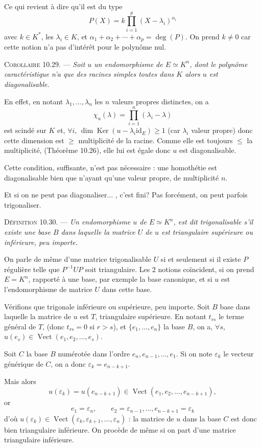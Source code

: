 Ce qui revient à dire qu'il est du type
\[
P(X)=k\prod_{i=1}^p(X-\lambda_i)^{\alpha_i}
\]
avec $k\in K^*$, les $\lambda_i\in K$, et $\alpha_1+\alpha_2+\cdots+\alpha_p=\deg(P)$. On prend $k\ne0$ car cette notion n'a pas d'intérêt pour le polynôme nul.

\medskip\noindent\textsc{Corollaire 10.29.} --- \emph{Soit $u$ un endomorphisme de $E\simeq K^n$, dont le polynôme caractéristique n'a que des racines simples toutes dans $K$ alors $u$ est diagonalisable.}

En effet, en notant $\lambda_1,\ldots,\lambda_n$ les $n$ valeurs propres distinctes, on a
\[
\chi_u(\lambda)=\prod_{i=1}^n(\lambda_i-\lambda)
\]
est scindé sur $K$ et, $\forall i$, $\dim\operatorname{Ker}(u-\lambda_i\mathrm{id}_E)\ge1$ (car $\lambda_i$ valeur propre) donc cette dimension est $\ge$ multiplicité de la racine. Comme elle est toujours $\le$ la multiplicité, (Théorème 10.26), elle lui est égale donc $u$ est diagonalisable. \bookend

Cette condition, suffisante, n'est pas nécessaire : une homothétie est diagonalisable bien que n'ayant qu'une valeur propre, de multiplicité $n$.

Et si on ne peut pas diagonaliser... , c'est fini? Pas forcément, on peut parfois trigonaliser.

\medskip\noindent\textsc{Définition 10.30.} --- \emph{Un endomorphisme $u$ de $E\simeq K^n$, est dit trigonalisable s'il existe une base $B$ dans laquelle la matrice $U$ de $u$ est triangulaire supérieure ou inférieure, peu importe.}

On parle de même d'une matrice trigonalisable $U$ si et seulement si il existe $P$ régulière telle que $P^{-1}UP$ soit triangulaire. Les 2 notions coïncident, si on prend $E=K^n$, rapporté à une base, par exemple la base canonique, et si $u$ est l'endomorphisme de matrice $U$ dans cette base.

Vérifions que trigonale inférieure ou supérieure, peu importe. Soit $B$ base dans laquelle la matrice de $u$ est $T$, triangulaire supérieure. En notant $t_{rs}$ le terme général de $T$, (donc $t_{rs}=0$ si $r>s$), et $\{e_1,\ldots,e_n\}$ la base $B$, on a, $\forall s$, $u(e_s)\in\operatorname{Vect}(e_1,e_2,\ldots,e_s)$.

Soit $C$ la base $B$ numérotée dans l'ordre $e_n,e_{n-1},\ldots,e_1$. Si on note $\varepsilon_k$ le vecteur générique de $C$, on a donc $\varepsilon_k=e_{n-k+1}$.

Mais alors
\[
u(\varepsilon_k)=u(e_{n-k+1})\in\operatorname{Vect}(e_1,e_2,\ldots,e_{n-k+1}),
\]
or
\[
e_1=\varepsilon_n,
\qquad e_2=\varepsilon_{n-1},\ldots,e_{n-k+1}=\varepsilon_k
\]
d'où $u(\varepsilon_k)\in\operatorname{Vect}(\varepsilon_k,\varepsilon_{k+1},\ldots,\varepsilon_n)$ : la matrice de $u$ dans la base $C$ est donc bien triangulaire inférieure. On procède de même si on part d'une matrice triangulaire inférieure. \bookend

